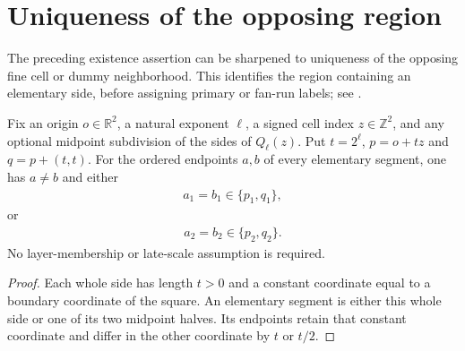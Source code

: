 \section{Uniqueness of the opposing region}
\label{sec:area_law_unique_side_opponents}

The preceding existence assertion can be sharpened to uniqueness of the
opposing fine cell or dummy neighborhood. This identifies the region
containing an elementary side, before assigning primary or fan-run labels;
see \cite[Section~11]{OpenAI2026AreaLaw}.


\begin{lemma}
    \label{thm:area_law_elementary_side_boundary_geometry}
    \leanok
    Fix an origin $o\in\mathbb R^2$, a natural exponent $\ell$, a signed
    cell index $z\in\mathbb Z^2$, and any optional midpoint subdivision
    of the sides of $Q_\ell(z)$. Put $t=2^\ell$, $p=o+tz$ and
    $q=p+(t,t)$. For the ordered endpoints $a,b$ of every elementary
    segment, one has $a\ne b$ and either
    \begin{align}
        a_1=b_1\in\{p_1,q_1\},
    \end{align}
    or
    \begin{align}
        a_2=b_2\in\{p_2,q_2\}.
    \end{align}
    No layer-membership or late-scale assumption is required.
\end{lemma}
\begin{proof}\leanok
    Each whole side has length $t>0$ and a constant coordinate equal
    to a boundary coordinate of the square. An elementary segment is
    either this whole side or one of its two midpoint halves. Its
    endpoints retain that constant coordinate and differ in the other
    coordinate by $t$ or $t/2$.
\end{proof}

